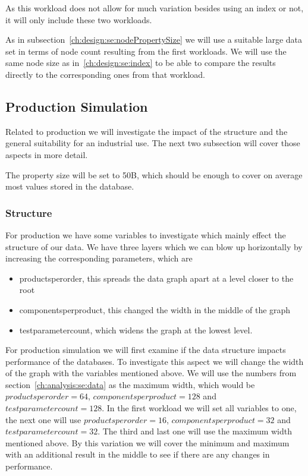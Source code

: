 As this workload does not allow for much variation besides using an index or not,
it will only include these two workloads.

As in subsection~\ref{ch:design:se:nodePropertySize} we will use a suitable large data set in terms of node count resulting from the first workloads.
We will use the same node size as in~\ref{ch:design:se:index} to be able to compare the results directly to the corresponding ones from that workload.

\subsection{Production Simulation}
\label{ch:design:se:productionSimulation}
Related to production we will investigate the impact of the structure and the general suitability for an industrial use.
The next two subsection will cover those aspects in more detail.

The property size will be set to 50B,
which should be enough to cover on average most values stored in the database.

\subsubsection{Structure}
For production we have some variables to investigate which mainly effect the structure of our data.
We have three layers which we can blow up horizontally by increasing the corresponding parameters,
which are

\begin{itemize}
  \item productsperorder, this spreads the data graph apart at a level closer to the root
  \item componentsperproduct, this changed the width in the middle of the graph
  \item testparametercount, which widens the graph at the lowest level.
\end{itemize}

For production simulation we will first examine if the data structure impacts performance of the databases.
To investigate this aspect we will change the width of the graph with the variables mentioned above.
We will use the numbers from section~\ref{ch:analysis:se:data} as the maximum width,
which would be $ productsperorder = 64 $, \linebreak
$ componentsperproduct = 128 $ and $ testparametercount = 128 $.
In the first workload we will set all variables to one,
the next one will use $ productsperorder = 16 $, $ componentsperproduct = 32 $ and $ testparametercount = 32 $.
The third and last one will use the maximum width mentioned above.
By this variation we will cover the minimum and maximum with an additional result in the middle to see if there are any changes in performance.

